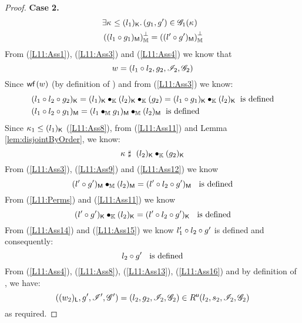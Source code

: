 \begin{lemma}[]
\begin{proof}
\noindent\textbf{Case 2.} 
%
\begin{align}
	& \exists \kappa_{} \leq (l_1)_{\textsf{K}}.\, (g_1, g') \in \mathscr{G}_{1}(\kappa_{}) \label{L11:Ass8} \\
	&\left( (l_1 \circ g_1)_{\textsf{M}}\right)_{\mathbb{M}}^{\bot} = \left( (l' \circ g')_{\textsf{M}}\right)_{\mathbb{M}}^{\bot} \label{L11:Ass9}
\end{align}
%
From (\ref{L11:Ass1}), (\ref{L11:Ass3}) and (\ref{L11:Ass4}) we know that 
%
\begin{equation}
	w = (l_1 \circ l_2, g_2, \mathscr{I}_{2}, \mathscr{G}_{2}) \label{L11:Ass10}
\end{equation}
%
Since $\textsf{wf}\left( w \right)$ (by definition of \Worlds) and from (\ref{L11:Ass3}) we know:
\begin{align}
	&\capPart{(l_1 \composeL l_2 \composeL g_2)} = \capPart{(l_1)} \composeCap \capPart{(l_2)} \composeCap {(g_2)} = \capPart{(l_1 \composeL g_1)} \composeCap \capPart{(l_2)}\hspace*{0.2cm} \text{is defined} \label{L11:Ass11}\\
%	
	&\heapPart{(l_1 \composeL l_2 \composeL g_1)} = \heapPart{(l_1 \composeH g_1)} \composeH \heapPart{(l_2)}  \hspace*{0.2cm} \text{is defined} \label{L11:Ass12}
\end{align}
%
Since $\kappa_{1} \leq (l_1)_{\textsf{K}}$ (\ref{L11:Ass8}), from (\ref{L11:Ass11}) and Lemma \ref{lem:disjointByOrder}, we know:
%
\begin{equation}
	\kappa_{} \mathrel{\sharp}\ (l_2)_{\textsf{K}} \bullet_{\mathbb{K}} (g_2)_{\textsf{K}} \label{L11:Ass13}
\end{equation}
%
From (\ref{L11:Ass3}), (\ref{L11:Ass9}) and (\ref{L11:Ass12}) we know
%
\begin{equation}
	(l' \circ g')_{\textsf{M}} \bullet_{\mathbb{M}} (l_2)_{\textsf{M}} = (l' \circ l_2 \circ g')_{\textsf{M}}\hspace*{0.2cm}\text{ is defined} \label{L11:Ass14}
\end{equation}
%
From (\ref{L11:Perms}) and (\ref{L11:Ass11}) we know
%
\begin{equation}
	(l' \circ g')_{\textsf{K}} \bullet_{\mathbb{K}} (l_2)_{\textsf{K}} = (l' \circ l_2 \circ g')_{\textsf{K}}\hspace*{0.2cm}\text{ is defined} \label{L11:Ass15}
\end{equation}
%
From (\ref{L11:Ass14}) and (\ref{L11:Ass15}) we know $l'_1 \circ l_2 \circ g'$ is defined and consequently:
%
\begin{equation}
	l_2 \circ g' \hspace*{0.2cm} \text{ is defined} \label{L11:Ass16}
\end{equation}
%
From (\ref{L11:Ass4}), (\ref{L11:Ass8}), (\ref{L11:Ass13}), (\ref{L11:Ass16}) and by definition of \updateR, we have:
%
\begin{equation*}
	((w_2)_{\textsf{L}}, g', \mathscr{I}', \mathscr{G}') = (l_2, g_2, \mathscr{I}_{2}, \mathscr{G}_{2}) \in R^{\textsf{u}}(l_2, s_2, \mathscr{I}_{2}, \mathscr{G}_{2})  
\end{equation*}
%
as required.
\end{proof}
%
\end{lemma}
